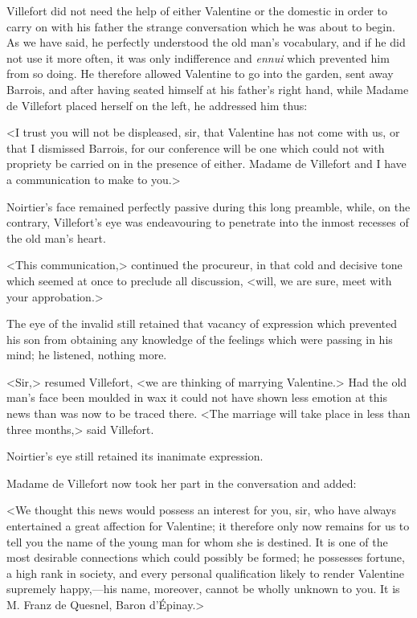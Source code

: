  Villefort did not need the help of either Valentine or the domestic in order to carry on with his father the strange conversation which he was about to begin. As we have said, he perfectly understood the old man's vocabulary, and if he did not use it more often, it was only indifference and \textit{ennui} which prevented him from so doing. He therefore allowed Valentine to go into the garden, sent away Barrois, and after having seated himself at his father's right hand, while Madame de Villefort placed herself on the left, he addressed him thus: 

 <I trust you will not be displeased, sir, that Valentine has not come with us, or that I dismissed Barrois, for our conference will be one which could not with propriety be carried on in the presence of either. Madame de Villefort and I have a communication to make to you.> 

 Noirtier's face remained perfectly passive during this long preamble, while, on the contrary, Villefort's eye was endeavouring to penetrate into the inmost recesses of the old man's heart. 

 <This communication,> continued the procureur, in that cold and decisive tone which seemed at once to preclude all discussion, <will, we are sure, meet with your approbation.> 

 The eye of the invalid still retained that vacancy of expression which prevented his son from obtaining any knowledge of the feelings which were passing in his mind; he listened, nothing more. 

 <Sir,> resumed Villefort, <we are thinking of marrying Valentine.> Had the old man's face been moulded in wax it could not have shown less emotion at this news than was now to be traced there. <The marriage will take place in less than three months,> said Villefort. 

 Noirtier's eye still retained its inanimate expression. 

 Madame de Villefort now took her part in the conversation and added: 

 <We thought this news would possess an interest for you, sir, who have always entertained a great affection for Valentine; it therefore only now remains for us to tell you the name of the young man for whom she is destined. It is one of the most desirable connections which could possibly be formed; he possesses fortune, a high rank in society, and every personal qualification likely to render Valentine supremely happy,—his name, moreover, cannot be wholly unknown to you. It is M. Franz de Quesnel, Baron d'Épinay.> 

